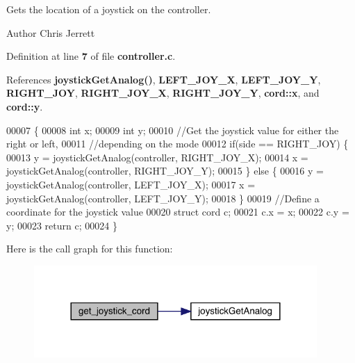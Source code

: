 Gets the location of a joystick on the controller. 

\begin{DoxyAuthor}{Author}
Chris Jerrett 
\end{DoxyAuthor}


Definition at line \textbf{ 7} of file \textbf{ controller.\+c}.



References \textbf{ joystick\+Get\+Analog()}, \textbf{ L\+E\+F\+T\+\_\+\+J\+O\+Y\+\_\+X}, \textbf{ L\+E\+F\+T\+\_\+\+J\+O\+Y\+\_\+Y}, \textbf{ R\+I\+G\+H\+T\+\_\+\+J\+OY}, \textbf{ R\+I\+G\+H\+T\+\_\+\+J\+O\+Y\+\_\+X}, \textbf{ R\+I\+G\+H\+T\+\_\+\+J\+O\+Y\+\_\+Y}, \textbf{ cord\+::x}, and \textbf{ cord\+::y}.


\begin{DoxyCode}
00007                                                                   \{
00008   \textcolor{keywordtype}{int} x;
00009   \textcolor{keywordtype}{int} y;
00010   \textcolor{comment}{//Get the joystick value for either the right or left,}
00011   \textcolor{comment}{//depending on the mode}
00012   \textcolor{keywordflow}{if}(side == RIGHT_JOY) \{
00013     y = joystickGetAnalog(controller, RIGHT_JOY_X);
00014     x = joystickGetAnalog(controller, RIGHT_JOY_Y);
00015   \} \textcolor{keywordflow}{else} \{
00016     y = joystickGetAnalog(controller, LEFT_JOY_X);
00017     x = joystickGetAnalog(controller, LEFT_JOY_Y);
00018   \}
00019   \textcolor{comment}{//Define a coordinate for the joystick value}
00020   \textcolor{keyword}{struct }cord c;
00021   c.x = x;
00022   c.y = y;
00023   \textcolor{keywordflow}{return} c;
00024 \}
\end{DoxyCode}
Here is the call graph for this function\+:\nopagebreak
\begin{figure}[H]
\begin{center}
\leavevmode
\includegraphics[width=305pt]{controller_8h_a0ce0176099c0bb15ad8c36123222059d_cgraph}
\end{center}
\end{figure}
